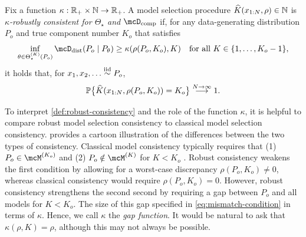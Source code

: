 \begin{definition} \label{def:robust-consistency}
	Fix a function $\kappa : \mathbb{R}_{+} \times \mathbb{N} \to \mathbb{R}_{+}$. 
	A model selection procedure $\widehat K(x_{1:N}, \rho) \in \mathbb{N}$ is \emph{$\kappa$-robustly consistent for $\Theta_{\star}$ and $\compDisc$} if,
	for any data-generating distribution $P_o$ and true component number $K_o$ that satisfies 
	\[ \label{eq:mismatch-condition}
		\inf_{\theta \in \Theta_{\star}^{(K)}(P_{o})} \distDisc(P_{o} \mid P_{\theta}) \ge \kappa(\rho(P_{o}, K_{o}), K)
		\quad\text{for all $K \in \{1,\dots,K_{o}-1\}$},
	\]
	it holds that, for $x_{1}, x_{2}, \dots \stackrel{\text{iid}}{\sim} P_{o}$, 
	\[
		\mathbb{P}\big\{\widehat K(x_{1:N}, \rho(P_{o}, K_{o})) = K_o \big\} \overset{N \to \infty}{\longrightarrow} 1.
	\]
\end{definition}
To interpret \cref{def:robust-consistency} and the role of the function $\kappa$, 
it is helpful to compare robust model selection consistency to classical model selection consistency.
 provides a cartoon illustration of the differences between the two types of consistency. 
Classical model consistency typically requires that  
(1) $P_o \in \model{K_o}$ and (2) $P_{o} \notin \model{K}$ for $K < K_o$ .
Robust consistency weakens the first condition by allowing for a worst-case discrepancy $\rho(P_{o}, K_{o}) \ne 0$,
whereas classical consistency would require $\rho(P_{o}, K_{o}) = 0$.
However, robust consistency strengthens the second second by requiring a gap between $P_o$ 
and all models for $K < K_o$.
The size of this gap specified in \cref{eq:mismatch-condition} in terms of $\kappa$. 
Hence, we call $\kappa$ the \emph{gap function}. 
It would be natural to ask that $\kappa(\rho, K) = \rho$, although this may not always be possible. 

